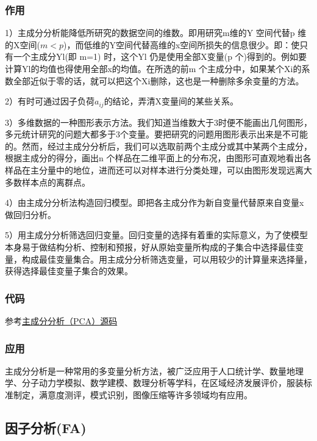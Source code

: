 \subsubsection{作用}

1）主成分分析能降低所研究的数据空间的维数。即用研究m维的Y 空间代替p 维的X空间($m < p$)，而低维的Y空间代替高维的x空间所损失的信息很少。即：使只有一个主成分Yl(即 m=1) 时，这个Yl 仍是使用全部X变量(p 个)得到的。例如要计算Yl的均值也得使用全部x的均值。在所选的前m 个主成分中，如果某个Xi的系数全部近似于零的话，就可以把这个Xi删除，这也是一种删除多余变量的方法。

2）有时可通过因子负荷$a_{ij}$的结论，弄清X变量间的某些关系。

3）多维数据的一种图形表示方法。我们知道当维数大于3时便不能画出几何图形，多元统计研究的问题大都多于3个变量。要把研究的问题用图形表示出来是不可能的。然而，经过主成分分析后，我们可以选取前两个主成分或其中某两个主成分，根据主成分的得分，画出n 个样品在二维平面上的分布况，由图形可直观地看出各样品在主分量中的地位，进而还可以对样本进行分类处理，可以由图形发现远离大多数样本点的离群点。

4）由主成分分析法构造回归模型。即把各主成分作为新自变量代替原来自变量x做回归分析。

5）用主成分分析筛选回归变量。回归变量的选择有着重的实际意义，为了使模型本身易于做结构分析、控制和预报，好从原始变量所构成的子集合中选择最佳变量，构成最佳变量集合。用主成分分析筛选变量，可以用较少的计算量来选择量，获得选择最佳变量子集合的效果。

\subsubsection{代码}

参考\href{https://github.com/heucoder/dimensionality_reduction_alo_codes}{主成分分析（PCA）源码}



\subsubsection{应用}

主成分分析是一种常用的多变量分析方法，被广泛应用于人口统计学、数量地理学、分子动力学模拟、数学建模、数理分析等学科，在区域经济发展评价，服装标准制定，满意度测评，模式识别，图像压缩等许多领域均有应用。

\subsection{因子分析(FA)}

